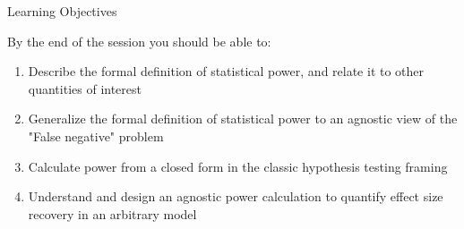 \documentclass[
  ignorenonframetext,
  aspectratio=169,
]{beamer}
\begin{document}
\begin{frame}{Learning Objectives}
\label{learning-objectives}
\vspace{0.3em}

\small By the end of the session you should be able to:

\vspace{0.4em}

\begin{center}
\begin{enumerate}
  \item Describe the formal definition of statistical power, and relate it to other quantities of interest 
  \item Generalize the formal definition of statistical power to an agnostic view of the "False negative" problem
  \item Calculate power from a closed form in the classic hypothesis testing framing 
  \item Understand and design an agnostic power calculation to quantify effect size recovery in an arbitrary model
\end{enumerate}
\end{center}
\end{frame}
\end{document}
